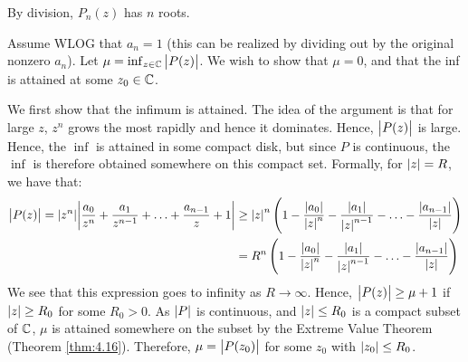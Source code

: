 \begin{ncorollary}{}{}
    By division, $P_n(z)$ has $n$ roots. 
\end{ncorollary}

\begin{nproof}
    Assume WLOG that $a_n = 1$ (this can be realized by dividing out by the original nonzero $a_n$). Let $\mu = \inf_{z \in \mathbb{C}}\abs{P(z)}$. We wish to show that $\mu = 0$, and that the inf is attained at some $z_0 \in \mathbb{C}$. 

    We first show that the infimum is attained. The idea of the argument is that for large $z$, $z^n$ grows the most rapidly and hence it dominates. Hence, $\abs{P(z)}$ is large. Hence, the $\inf$ is attained in some compact disk, but since $P$ is continuous, the $\inf$ is therefore obtained somewhere on this compact set. Formally, for $\abs{z} = R$, we have that:
    \begin{align*}
        \abs{P(z)} = \abs{z^n}\abs{\frac{a_0}{z^n} + \frac{a_1}{z^{n-1}} + \ldots + \frac{a_{n-1}}{z} + 1} &\geq \abs{z}^n\left(1 - \frac{\abs{a_0}}{\abs{z}^n} - \frac{\abs{a_1}}{\abs{z}^{n-1}} - \ldots - \frac{\abs{a_{n-1}}}{\abs{z}}\right)
        \\ &= R^n\left(1 - \frac{\abs{a_0}}{\abs{z}^n} - \frac{\abs{a_1}}{\abs{z}^{n-1}} - \ldots - \frac{\abs{a_{n-1}}}{\abs{z}}\right)
    \end{align*}
    We see that this expression goes to infinity as $R \rightarrow \infty$. Hence, $\abs{P(z)} \geq \mu + 1$ if $\abs{z} \geq R_0$ for some $R_0 > 0$. As $\abs{P}$ is continuous, and $\abs{z} \leq R_0$ is a compact subset of $\mathbb{C}$, $\mu$ is attained somewhere on the subset by the Extreme Value Theorem (Theorem \ref{thm:4.16}). Therefore, $\mu = \abs{P(z_0)}$ for some $z_0$ with $\abs{z_0} \leq R_0$. 


\end{nproof}
